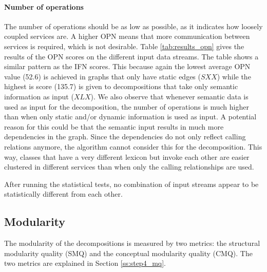 

\paragraph{Number of operations}
The number of operations should be as low as possible, as it indicates how loosely coupled services are. A higher OPN means that more communication between services is required, which is not desirable. Table \ref{tab:results_opn} gives the results of the OPN scores on the different input data streams. The table shows a similar pattern as the IFN scores. This because again the lowest average OPN value (52.6) is achieved in graphs that only have static edges ($SXX$) while the highest is score (135.7) is given to decompositions that take only semantic information as input ($XLX$). We also observe that whenever semantic data is used as input for the decomposition, the number of operations is much higher than when only static and/or dynamic information is used as input. A potential reason for this could be that the semantic input results in much more dependencies in the graph. Since the dependencies do not only reflect calling relations anymore, the algorithm cannot consider this for the decomposition. This way, classes that have a very different lexicon but invoke each other are easier clustered in different services than when only the calling relationships are used. \par
After running the statistical tests, no combination of input streams appear to be statistically different from each other. 



\subsection{Modularity}
The modularity of the decompositions is measured by two metrics: the structural modularity quality (SMQ) and the conceptual modularity quality (CMQ). The two metrics are explained in Section \ref{ss:step4_mq}.

